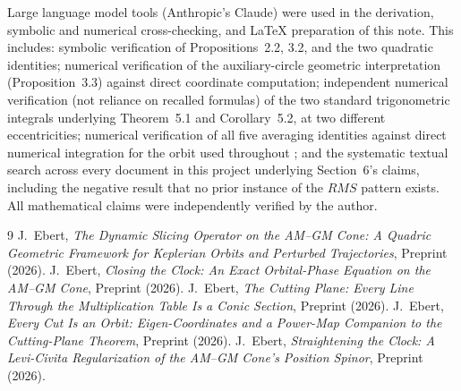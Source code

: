 \documentclass[12pt]{amsart}
\theoremstyle{plain}
\theoremstyle{remark}
\begin{document}
Large language model tools (Anthropic's Claude) were used in the derivation, symbolic and numerical cross-checking, and \LaTeX{} preparation of this note. This includes: symbolic verification of Propositions~2.2, 3.2, and the two quadratic identities; numerical verification of the auxiliary-circle geometric interpretation (Proposition~3.3) against direct coordinate computation; independent numerical verification (not reliance on recalled formulas) of the two standard trigonometric integrals underlying Theorem~5.1 and Corollary~5.2, at two different eccentricities; numerical verification of all five averaging identities against direct numerical integration for the orbit used throughout \cite{Ebert2026Clock,Ebert2026LeviCivita}; and the systematic textual search across every document in this project underlying Section~6's claims, including the negative result that no prior instance of the $RMS$ pattern exists. All mathematical claims were independently verified by the author.

\begin{thebibliography}{9}
 J.~Ebert, \emph{The Dynamic Slicing Operator on the AM--GM Cone: A Quadric Geometric Framework for Keplerian Orbits and Perturbed Trajectories}, Preprint (2026).
 J.~Ebert, \emph{Closing the Clock: An Exact Orbital-Phase Equation on the AM--GM Cone}, Preprint (2026).
 J.~Ebert, \emph{The Cutting Plane: Every Line Through the Multiplication Table Is a Conic Section}, Preprint (2026).
 J.~Ebert, \emph{Every Cut Is an Orbit: Eigen-Coordinates and a Power-Map Companion to the Cutting-Plane Theorem}, Preprint (2026).
 J.~Ebert, \emph{Straightening the Clock: A Levi-Civita Regularization of the AM--GM Cone's Position Spinor}, Preprint (2026).
\end{thebibliography}
\end{document}
